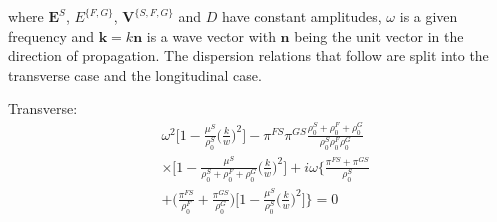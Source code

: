 \documentclass[twocolumn]{article}
\begin{document}
where $\textbf{E}^S$, $E^{\{F,G\}}$, $\textbf{V}^{\{S, F, G\}}$ and $D$ have constant amplitudes, $\omega$ is a given frequency and $\textbf{k} = k\textbf{n}$ is a wave vector with $\textbf{n}$ being the unit vector in the direction of propagation. The dispersion relations that follow are split into the transverse case and the longitudinal case.

Transverse:
\begin{align*}
     & \omega^2\bigl[1 - \frac{\mu^S}{\rho_0^S}\bigl(\frac{k}{w}\bigr)^2\bigr]
    -\pi^{FS}\pi^{GS}\frac{\rho_0^S + \rho_0^F + \rho_0^G}{\rho_0^S\rho_0^F\rho_0^G}             \\
     & \times\bigl[1-\frac{\mu^S}{\rho_0^S + \rho_0^F + \rho_0^G}\bigl(\frac{k}{w}\bigr)^2\bigr]
    +i\omega\bigl\{\frac{\pi^{FS} + \pi^{GS}}{\rho_0^S}                                          \\
     & + \bigl(\frac{\pi^{FS}}{\rho_0^F} + \frac{\pi^{GS}}{\rho_0^G}\bigr)
    \bigl[1-\frac{\mu^S}{\rho_0^S}\bigl(\frac{k}{w}\bigr)^2\bigr]\bigr\} = 0
\end{align*}
\end{document}
